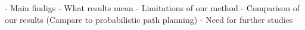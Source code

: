 - Main findigs
- What results mean
- Limitations of our method
- Comparison of our results (Campare to probabilistic path planning)
- Need for further studies